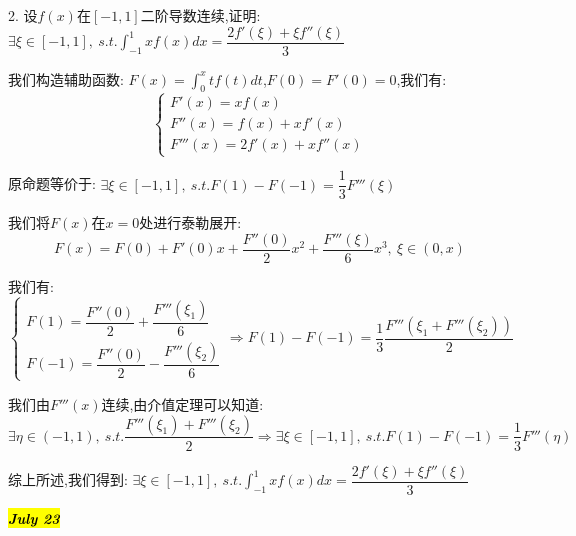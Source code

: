 2. 设$f(x)$在$[-1,1]$二阶导数连续,证明: $\exists \xi\in[-1,1],\ s.t. \int_{-1}^{1}xf(x)dx=\dfrac{2f'(\xi)+\xi f''(\xi)}{3}$
\begin{solution}
	
	我们构造辅助函数: $F(x)=\int_{0}^{x}tf(t)dt$,$F(0)=F'(0)=0$,我们有: $$\left\lbrace
	\begin{array}{l}
		F'(x)=xf(x)\\F''(x)=f(x)+xf'(x)\\F'''(x)=2f'(x)+xf''(x)
	\end{array}
	\right. $$
	
	原命题等价于: $\exists \xi\in[-1,1],\ s.t. F(1)-F(-1)=\dfrac{1}{3}F'''(\xi)$
	
	我们将$F(x)$在$x=0$处进行泰勒展开: 
	$$F(x)=F(0)+F'(0)x+\dfrac{F''(0)}{2}x^2+\dfrac{F'''(\xi)}{6}x^3, \ \xi\in(0,x) $$
	
	我们有: 
	$$\left\lbrace
	\begin{array}{l}
		F(1)=\dfrac{F''(0)}{2}+\dfrac{F'''(\xi_{1})}{6}\\
		F(-1)=\dfrac{F''(0)}{2}-\dfrac{F'''(\xi_{2})}{6}
	\end{array}
	\right. \Rightarrow F(1)-F(-1)=\dfrac{1}{3}\dfrac{F'''(\xi_{1}+F'''(\xi_{2}))}{2}$$
	
	我们由$F'''(x)$连续,由介值定理可以知道: 
	$$\exists \eta\in(-1,1),\ s.t. \dfrac{F'''(\xi_{1})+F'''(\xi_{2})}{2}\Rightarrow \exists \xi\in[-1,1],\ s.t. F(1)-F(-1)=\dfrac{1}{3}F'''(\eta)$$
	
	综上所述,我们得到: $\exists \xi\in[-1,1],\ s.t. \int_{-1}^{1}xf(x)dx=\dfrac{2f'(\xi)+\xi f''(\xi)}{3}$
\end{solution}

\hl{\textbf{\textit{July 23}}}

